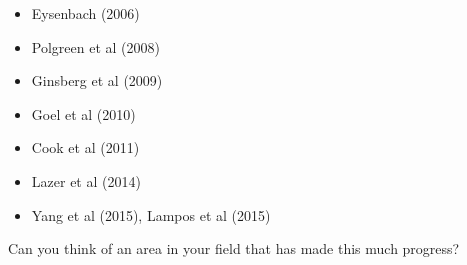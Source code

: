 \documentclass[aspectratio=169]{beamer}
\begin{document}
\begin{frame}

\begin{itemize}
\item Eysenbach (2006)
\item Polgreen et al (2008)
\item Ginsberg et al (2009)
\item Goel et al (2010)
\item Cook et al (2011)
\item Lazer et al (2014)
\item Yang et al (2015), Lampos et al (2015)
\end{itemize}

\end{frame}
\begin{frame}

{\Large
\begin{center}
Can you think of an area in your field that has made this much progress?
\end{center}
}

\end{frame}
\end{document}

